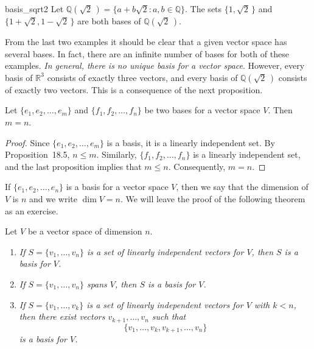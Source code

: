 \begin{example}{basis_sqrt2}
Let $\mbox{${\mathbb Q}( \sqrt{2}\, )$} = \{ a + b \sqrt{2} : a, b \in {\mathbb Q} \}$.
The sets $\{1, \sqrt{2}\,  \}$ and $\{1+\sqrt{2}, 1- \sqrt{2}\,  \}$ are
both bases of ${\mathbb Q}( \sqrt{2}\, )$.  
\end{example}





From the last two examples it should be clear that a given vector
space has several bases. In fact, there are an infinite number of
bases for both of these examples. {\em In general, there is no unique 
basis for a vector space}.  However, every basis of ${\mathbb R}^3$ consists
of exactly three vectors, and every  basis of ${\mathbb Q}(\sqrt{2}\, )$ 
consists of exactly two vectors. This is a consequence of the next 
proposition.


\begin{proposition}
Let $\{ e_1, e_2, \ldots, e_m \}$ and $\{ f_1, f_2, \ldots, f_n \}$ be
two bases for a vector space $V$. Then $m=n$. 
\end{proposition}


\begin{proof}
Since $\{ e_1, e_2, \ldots, e_m \}$ is a basis, it is a linearly
independent set.  By  Proposition~18.5, $n \leq m$. Similarly, $\{
f_1, f_2, \ldots, f_n \}$ is a linearly independent set, and the last
proposition implies that $m \leq n$.  Consequently, $m =n$.
\mbox{\hspace{1in}}
\end{proof}
 

\medskip
 

If $\{ e_1, e_2, \ldots, e_n \}$ is a basis for a vector space $V$,
then we say that the {\bfi dimension\/}
of $V$ is $n$ and we write $\dim V =n$\label{vectdim}. 
We will leave the proof of the following theorem as an exercise.


\begin{theorem}
Let $V$ be a vector space of dimension $n$.
\begin{enumerate}

\rm \item \it
If $S = \{v_1, \ldots, v_n \}$ is a set of linearly independent
vectors for $V$, then $S$ is a basis for $V$. 

\rm \item \it
If $S = \{v_1, \ldots, v_n \}$ spans $V$, then $S$ is a basis for $V$. 

\rm \item \it
If $S = \{v_1, \ldots, v_k \}$ is a set of linearly independent
vectors for $V$ with $k < n$, then there exist vectors $v_{k+1},
\ldots, v_n$ such that  
\[
\{v_1, \ldots, v_k, v_{k+1}, \ldots, v_n \}
\] 
is a basis for $V$. 

\end{enumerate}
\end{theorem}


